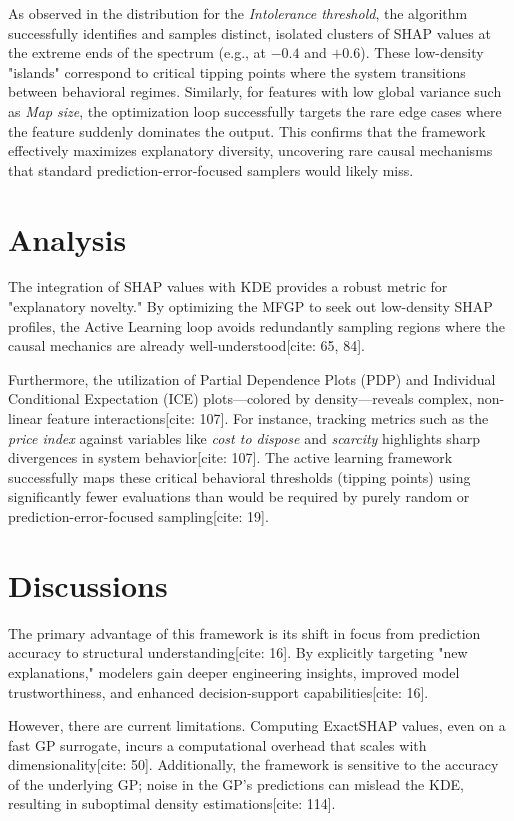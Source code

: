 \documentclass[sn-mathphys]{sn-jnl}
\theoremstyle{thmstyleone}%
\theoremstyle{thmstyletwo}%
\theoremstyle{thmstylethree}%
\begin{document}
As observed in the distribution for the \textit{Intolerance threshold}, the algorithm successfully identifies and samples distinct, isolated clusters of SHAP values at the extreme ends of the spectrum (e.g., at $-0.4$ and $+0.6$). These low-density "islands" correspond to critical tipping points where the system transitions between behavioral regimes. Similarly, for features with low global variance such as \textit{Map size}, the optimization loop successfully targets the rare edge cases where the feature suddenly dominates the output. This confirms that the framework effectively maximizes explanatory diversity, uncovering rare causal mechanisms that standard prediction-error-focused samplers would likely miss.


\section{Analysis}
The integration of SHAP values with KDE provides a robust metric for "explanatory novelty." By optimizing the MFGP to seek out low-density SHAP profiles, the Active Learning loop avoids redundantly sampling regions where the causal mechanics are already well-understood[cite: 65, 84].

Furthermore, the utilization of Partial Dependence Plots (PDP) and Individual Conditional Expectation (ICE) plots—colored by density—reveals complex, non-linear feature interactions[cite: 107]. For instance, tracking metrics such as the \textit{price index} against variables like \textit{cost to dispose} and \textit{scarcity} highlights sharp divergences in system behavior[cite: 107]. The active learning framework successfully maps these critical behavioral thresholds (tipping points) using significantly fewer evaluations than would be required by purely random or prediction-error-focused sampling[cite: 19]. 

\section{Discussions}
The primary advantage of this framework is its shift in focus from prediction accuracy to structural understanding[cite: 16]. By explicitly targeting "new explanations," modelers gain deeper engineering insights, improved model trustworthiness, and enhanced decision-support capabilities[cite: 16]. 

However, there are current limitations. Computing ExactSHAP values, even on a fast GP surrogate, incurs a computational overhead that scales with dimensionality[cite: 50]. Additionally, the framework is sensitive to the accuracy of the underlying GP; noise in the GP's predictions can mislead the KDE, resulting in suboptimal density estimations[cite: 114].
\end{document}
